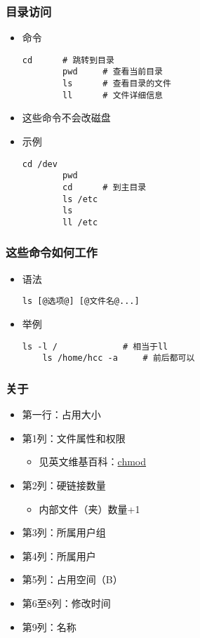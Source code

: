 \begin{CJK}{UTF8}{gbsn}
\begin{frame} [fragile]
	\frametitle{目录访问}
	\linespread{1}
	\begin{itemize}
	\item 命令
		\begin{lstlisting}[style=bashstyle, gobble=8, texcl]
		cd		# 跳转到目录
		pwd		# 查看当前目录
		ls		# 查看目录的文件
		ll		# 文件详细信息
		\end{lstlisting}
	\item 这些命令不会改磁盘
	\item 示例
		\begin{lstlisting}[style=bashstyle, gobble=8, texcl]
		cd /dev
		pwd
		cd		# 到主目录
		ls /etc
		ls
		ll /etc
	\end{lstlisting}
	\end{itemize}
\end{frame}

\begin{frame} [fragile]
	\frametitle{这些命令如何工作}
	\linespread{1.25}
	\begin{itemize}
	\item 语法
	\begin{lstlisting}[style=bashstyle, gobble=4, escapechar=@]
	ls [@选项@] [@文件名@...]
	\end{lstlisting}
	\item 举例
	\begin{lstlisting}[style=bashstyle, gobble=4, texcl]
	ls -l /				# 相当于ll
	ls /home/hcc -a		# 前后都可以
	\end{lstlisting}
	\end{itemize}
\end{frame}

\begin{frame} [fragile]
	\frametitle{关于}
	\linespread{1.25}
	\begin{itemize}
	\item 第一行：占用大小
	\item 第1列：文件属性和权限
		\begin{itemize}
		\item 见英文维基百科：\href{https://en.wikipedia.org/wiki/Chmod}{chmod}
		\end{itemize}
	\item 第2列：硬链接数量
		\begin{itemize}
		\item 内部文件（夹）数量+1
		\end{itemize}
	\item 第3列：所属用户组
	\item 第4列：所属用户
	\item 第5列：占用空间（B）
	\item 第6至8列：修改时间
	\item 第9列：名称
	\end{itemize}
\end{frame}


\end{CJK}
